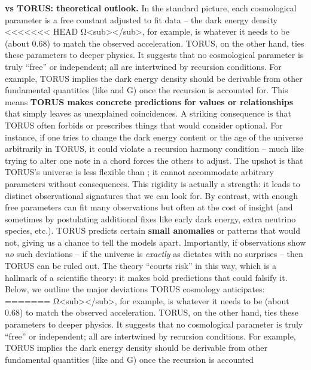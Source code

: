 \documentclass[]{article}
\begin{document}
\textbf{ vs TORUS: theoretical outlook.} In the standard picture,
each cosmological parameter is a free constant adjusted to fit data --
the dark energy density
<<<<<<< HEAD
Ω\textless sub\textgreater \Lambda\textless/sub\textgreater, for example, is
whatever it needs to be (about 0.68) to match the observed acceleration.
TORUS, on the other hand, ties these parameters to deeper physics. It
suggests that no cosmological parameter is truly ``free'' or
independent; all are intertwined by recursion conditions. For example,
TORUS implies the dark energy density should be derivable from other
fundamental quantities (like \alpha and G) once the recursion is accounted
for\hspace{0pt}. This means \textbf{TORUS makes concrete predictions for
values or relationships} that  simply leaves as unexplained
coincidences. A striking consequence is that TORUS often forbids or
prescribes things that  would consider optional. For instance, if
one tries to change the dark energy content or the age of the universe
arbitrarily in TORUS, it could violate a recursion harmony condition --
much like trying to alter one note in a chord forces the others to
adjust. The upshot is that TORUS's universe is less flexible than ;
it cannot accommodate arbitrary parameters without consequences. This
rigidity is actually a strength: it leads to distinct observational
signatures that we can look for. By contrast,  with enough free
parameters can fit many observations but often at the cost of insight
(and sometimes by postulating additional fixes like early dark energy,
extra neutrino species, etc.). TORUS predicts certain \textbf{small
anomalies} or patterns that  would not, giving us a chance to tell
the models apart. Importantly, if observations show \emph{no} such
deviations -- if the universe is \emph{exactly} as  dictates with no
surprises -- then TORUS can be ruled out. The theory ``courts risk'' in
this way\hspace{0pt}, which is a hallmark of a scientific theory: it
makes bold predictions that could falsify it. Below, we outline the
major deviations TORUS cosmology anticipates:
=======
Ω\textless{}sub\textgreater{}\Lambda\textless{}/sub\textgreater{}, for
example, is whatever it needs to be (about 0.68) to match the observed
acceleration. TORUS, on the other hand, ties these parameters to deeper
physics. It suggests that no cosmological parameter is truly ``free'' or
independent; all are intertwined by recursion conditions. For example,
TORUS implies the dark energy density should be derivable from other
fundamental quantities (like \alpha and G) once the recursion is accounted
\end{document}
